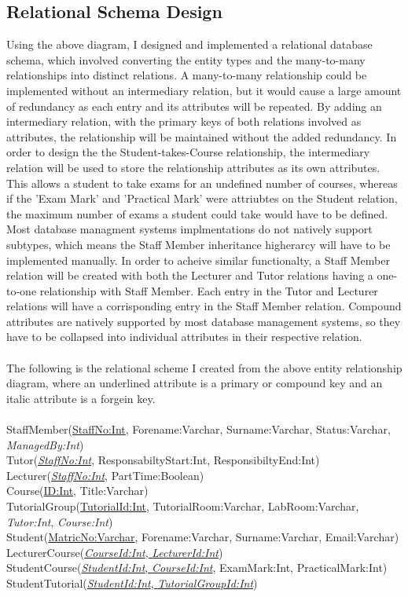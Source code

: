 \documentclass[12pt]{article}
\begin{document}
\subsection{Relational Schema Design}
Using the above diagram, I designed and implemented a relational database schema, which involved converting the entity types and the many-to-many relationships into distinct relations.
A many-to-many relationship could be implemented without an intermediary relation, but it would cause a large amount of redundancy as each entry and its attributes will be repeated.
By adding an intermediary relation, with the primary keys of both relations involved as attributes, the relationship will be maintained without the added redundancy.
In order to design the the Student-takes-Course relationship, the intermediary relation will be used to store the relationship attributes as its own attributes.
This allows a student to take exams for an undefined number of courses, whereas if the 'Exam Mark' and 'Practical Mark' were attriubtes on the Student relation, the maximum number of exams a student could take would have to be defined.
Most database managment systems implmentations do not natively support subtypes, which means the Staff Member inheritance higherarcy will have to be implemented manually.
In order to acheive similar functionalty, a Staff Member relation will be created with both the Lecturer and Tutor relations having a one-to-one relationship with Staff Member.
Each entry in the Tutor and Lecturer relations will have a corrisponding entry in the Staff Member relation.
Compound attributes are natively supported by most database management systems, so they have to be collapsed into individual attributes in their respective relation.
\\
\\
The following is the relational scheme I created from the above entity relationship diagram, where an underlined attribute is a primary or compound key and an italic attribute is a forgein key.\\\\
StaffMember(\underline{StaffNo:Int}, Forename:Varchar, Surname:Varchar, Status:Varchar, \textit{ManagedBy:Int})\\
Tutor(\underline{\textit{StaffNo:Int}}, ResponsabiltyStart:Int, ResponsibiltyEnd:Int)\\
Lecturer(\underline{\textit{StaffNo:Int}}, PartTime:Boolean)\\
Course(\underline{ID:Int}, Title:Varchar)\\
TutorialGroup(\underline{TutorialId:Int}, TutorialRoom:Varchar, LabRoom:Varchar, \textit{Tutor:Int}, \textit{Course:Int})\\
Student(\underline{MatricNo:Varchar}, Forename:Varchar, Surname:Varchar, Email:Varchar)\\
LecturerCourse(\underline{\textit{CourseId:Int}, \textit{LecturerId:Int}})\\
StudentCourse(\underline{\textit{StudentId:Int}, \textit{CourseId:Int}}, ExamMark:Int, PracticalMark:Int)\\
StudentTutorial(\underline{\textit{StudentId:Int}, \textit{TutorialGroupId:Int}})\\
\end{document}
